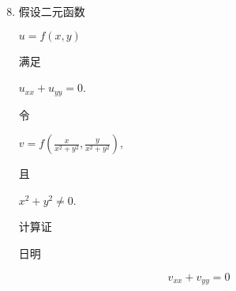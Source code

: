 \documentclass[10pt]{article}
\begin{document}
\begin{enumerate}
  \setcounter{enumi}{7}
  \item \begin{CJK}{UTF8}{mj}假设二元函数\end{CJK} $u=f(x, y)$ \begin{CJK}{UTF8}{mj}满足\end{CJK} $u_{x x}+u_{y y}=0$. \begin{CJK}{UTF8}{mj}令\end{CJK} $v=f\left(\frac{x}{x^{2}+y^{2}}, \frac{y}{x^{2}+y^{2}}\right)$, \begin{CJK}{UTF8}{mj}且\end{CJK} $x^{2}+y^{2} \neq 0$. \begin{CJK}{UTF8}{mj}计算证\end{CJK} \begin{CJK}{UTF8}{mj}日明\end{CJK}
\end{enumerate}
$$
v_{x x}+v_{y y}=0
$$
\end{document}
